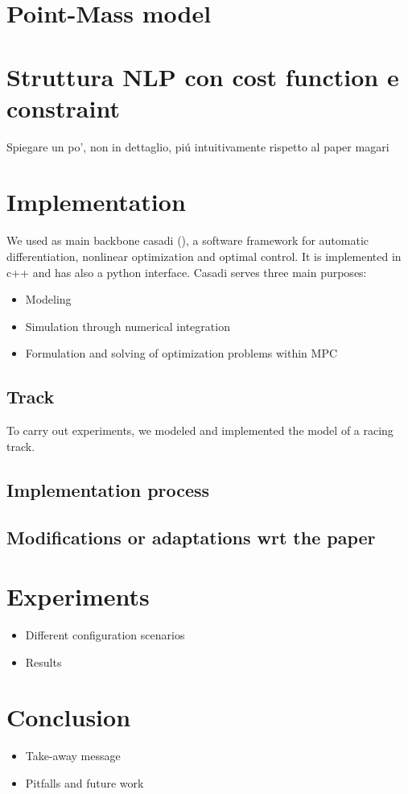 \documentclass[a4paper, onecolumn, 11pt, twoside]{article}
\begin{document}
\section*{Point-Mass model}



\newpage
\section*{Struttura NLP con cost function e constraint}

Spiegare un po', non in dettaglio, piú intuitivamente rispetto al paper magari

\section*{Implementation}

We used as main backbone casadi (\cite{casadi}), a software framework for automatic
differentiation, nonlinear optimization and optimal control. It is implemented
in c++ and has also a python interface. Casadi serves three main purposes:
\begin{itemize}
    \item Modeling
    \item Simulation through numerical integration
    \item Formulation and solving of optimization problems within MPC
\end{itemize}

\subsection*{Track}

To carry out experiments, we modeled and implemented the model of a racing
track. 

\subsection*{Implementation process}

\subsection*{Modifications or adaptations wrt the paper}


\section*{Experiments}


\begin{itemize}
    \item Different configuration scenarios
    \item Results
\end{itemize}



\section*{Conclusion}

\begin{itemize}
    \item Take-away message
    \item Pitfalls and future work
\end{itemize}




\end{document}
